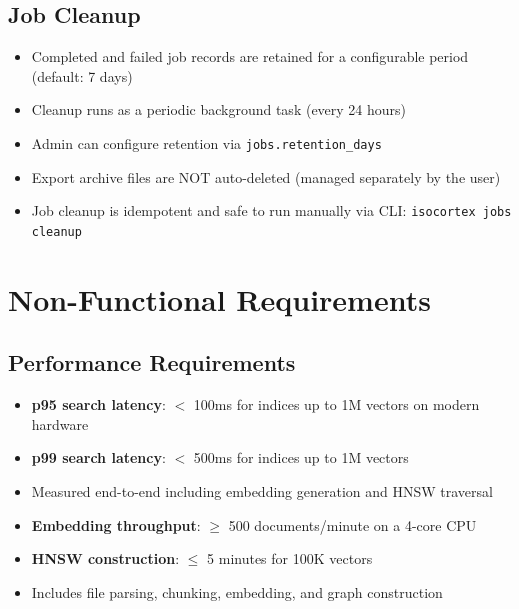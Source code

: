 \documentclass[11pt,a4paper]{article}
\newcommand{\inlinecode}[1]{\texttt{\small\colorbox{ctCodeBg}{#1}}}
\begin{document}
\subsection{Job Cleanup}

\begin{itemize}
    \item Completed and failed job records are retained for a configurable period (default: 7 days)
    \item Cleanup runs as a periodic background task (every 24 hours)
    \item Admin can configure retention via \inlinecode{jobs.retention\_days}
    \item Export archive files are NOT auto-deleted (managed separately by the user)
    \item Job cleanup is idempotent and safe to run manually via CLI: \inlinecode{isocortex jobs cleanup}
\end{itemize}

\section{Non-Functional Requirements}

\subsection{Performance Requirements}

\begin{reqbox}
\begin{itemize}
    \item \textbf{p95 search latency}: $<$ 100ms for indices up to 1M vectors on modern hardware
    \item \textbf{p99 search latency}: $<$ 500ms for indices up to 1M vectors
    \item Measured end-to-end including embedding generation and HNSW traversal
\end{itemize}
\end{reqbox}

\begin{reqbox}
\begin{itemize}
    \item \textbf{Embedding throughput}: $\geq$ 500 documents/minute on a 4-core CPU
    \item \textbf{HNSW construction}: $\leq$ 5 minutes for 100K vectors
    \item Includes file parsing, chunking, embedding, and graph construction
\end{itemize}
\end{reqbox}
\end{document}
